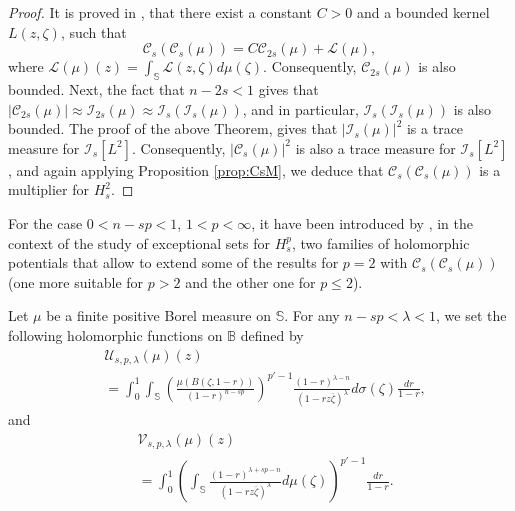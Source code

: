 \documentclass[12pt,twoside,leqno,final]{amsart}
\theoremstyle{plain}
\begin{document}
\begin{proof}

It is proved in \cite{ortegafabrega}, that there exist a constant $C>0$ and a bounded kernel $L(z,\zeta)$,  such that
$${\mathcal C}_s({\mathcal C}_s(\mu))=C {\mathcal C}_{2s}(\mu)+{\mathcal L}(\mu),$$
where ${\mathcal L}(\mu)(z)=\int_{{\mathbb S}} {\mathcal L}(z,\zeta)d\mu(\zeta).$
Consequently, ${\mathcal C}_{2s}(\mu)$ is also bounded. Next, the fact that $n-2s<1$ gives that $|{\mathcal C}_{2s}(\mu)|\approx {\mathcal I}_{2s}(\mu)\approx {\mathcal I}_s({\mathcal I}_s(\mu))$, and in particular, ${\mathcal I}_{s}(\mathcal{I}_s(\mu))$ is also bounded. The proof of the above Theorem, gives that $|\mathcal{I}_s(\mu)|^2$ is a trace measure for $\mathcal{I}_s[L^2]$. Consequently, $|{\mathcal C}_s(\mu)|^2$ is also a trace measure for $\mathcal{I}_s[L^2]$, and again applying Proposition \ref{prop:CsM}, we deduce that ${\mathcal C}_s({\mathcal C}_s(\mu))$ is a multiplier for $H_s^2$.
\end{proof}

For the case $0<n-sp<1$, $1<p<\infty$, it have been introduced by \cite{cohnverbitsky}, in the context of the study of exceptional sets for $H_s^p$, two families of holomorphic potentials that allow to extend some of the results for $p=2$ with ${\mathcal C}_s({\mathcal C}_s(\mu))$ (one more suitable for $p>2$ and the other one for $p\leq 2$). 

 Let $\mu$ be a finite positive Borel measure on ${{\mathbb S}}$. For any $n-sp<\lambda<1$,  we set the following holomorphic functions on ${{\mathbb B}}$ defined by
 \begin{equation}\begin{split}\label{holompot1}
 &{\mathcal U}_{s,p,\lambda}(\mu)(z)\\
 &=\int_0^1 \int_{{\mathbb S}}\left( \frac{\mu(B(\zeta, 1-r))}{(1-r)^{n-sp}}\right)^{p'-1} \frac{(1-r)^{\lambda-n}}{ (1-rz\overline{\zeta})^\lambda} d\sigma(\zeta) \frac{dr}{1-r},
 \end{split}\end{equation}
 and
 \begin{equation}\begin{split}\label{holompot2}
 &{\mathcal V}_{s,p,\lambda}(\mu)(z)\\
 &=\int_0^1 \left(\int_{{\mathbb S}} \frac{(1-r)^{\lambda+sp-n}}{(1-rz\overline{\zeta})^\lambda}  d\mu(\zeta) \right)^{p'-1}  \frac{dr}{1-r}.
 \end{split}\end{equation}
 
\end{document}
